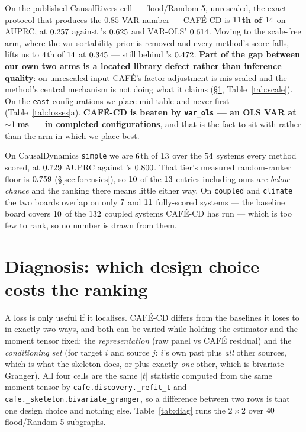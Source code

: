 \documentclass[10pt,twocolumn]{article}
\newcommand{\cafe}{CAF\'E}
\DeclareRobustCommand{\cd}{\cafe{}\nobreakdash-CD}
\begin{document}
On the published CausalRivers cell --- flood/Random-5, unrescaled, the exact protocol
that produces the $0.85$ VAR number --- \cd{} is \textbf{$11$th of $14$} on
AUPRC, at $0.257$ against \CRFloodScaleTop{}'s $0.625$ and
VAR-OLS' $0.614$. Moving to the scale-free arm, where the var-sortability
prior is removed and every method's score falls, lifts us to $4$th of
$14$ at $0.345$ --- still behind \CRFloodFreeTop{}'s
$0.472$. \textbf{Part of the gap between our own two arms is a located
library defect rather than inference quality}: on unrescaled input \cafe{}'s factor
adjustment is mis-scaled and the method's central mechanism is not doing what it claims
(\S\ref{sec:diag}, Table~\ref{tab:scale}). On the \texttt{east} configurations we place mid-table and
never first (Table~\ref{tab:losses}a). \textbf{\cd{} is beaten by
\texttt{var\_ols} --- an OLS VAR at $\sim$1\,ms --- in \LossVarAll{}
completed configurations}, and that is the fact to sit with rather than
the arm in which we place best.

On CausalDynamics \texttt{simple} we are $6$th of $13$ over the $54$
systems every method scored, at $0.729$ AUPRC against \DYtop{}'s $0.800$. That
tier's measured random-ranker floor is $0.759$ (\S\ref{sec:forensics}), so
$10$ of the $13$ entries including ours are \emph{below chance} and the
ranking there means little either way.
On \texttt{coupled} and \texttt{climate} the two boards overlap on only
$7{}$ and $11{}$ fully-scored systems --- the baseline board
covers $10{}$ of the $132{}$ coupled systems \cd{} has run --- which
is too few to rank, so no number is drawn from them.

\section{Diagnosis: which design choice costs the ranking}\label{sec:diag}
A loss is only useful if it localises. \cd{} differs from the baselines it loses to in
exactly two ways, and both can be varied while holding the estimator and the moment
tensor fixed: the \emph{representation} (raw panel vs \cafe{} residual) and the
\emph{conditioning set} (for target $i$ and source $j$: $i$'s own past plus \emph{all}
other sources, which is what the skeleton does, or plus exactly \emph{one} other, which
is bivariate Granger). All four cells are the same $|t|$ statistic computed from the
same moment tensor by \texttt{cafe.discovery.\_refit\_t} and
\texttt{cafe.\_skeleton.bivariate\_granger}, so a difference between two rows is that
one design choice and nothing else. Table~\ref{tab:diag} runs the $2\times2$ over $40$
flood/Random-5 subgraphs.
\end{document}
